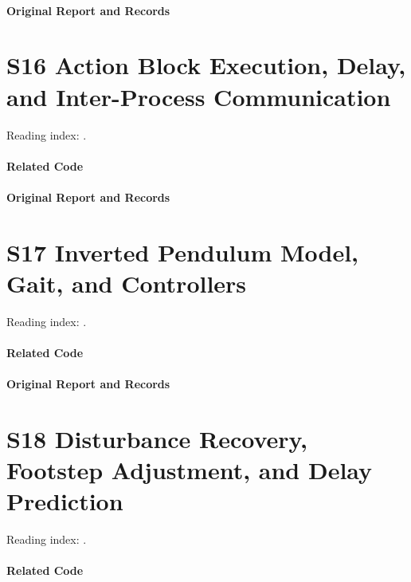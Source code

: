 \paragraph{Original Report and Records}
\noindent{}\par
\section*{S16 Action Block Execution, Delay, and Inter-Process Communication}
\hypertarget{code-s16}{}
Reading index: .
\paragraph{Related Code}
\noindent{}\par
\noindent{}\par
\paragraph{Original Report and Records}
\noindent{}\par
\noindent{}\par
\section*{S17 Inverted Pendulum Model, Gait, and Controllers}
\hypertarget{code-s17}{}
Reading index: .
\paragraph{Related Code}
\noindent{}\par
\paragraph{Original Report and Records}
\noindent{}\par
\section*{S18 Disturbance Recovery, Footstep Adjustment, and Delay Prediction}
\hypertarget{code-s18}{}
Reading index: .
\paragraph{Related Code}
\noindent{}\par

